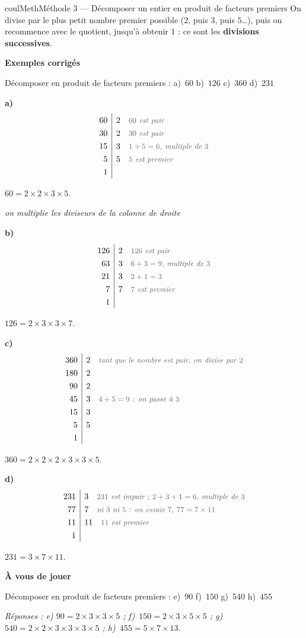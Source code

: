 \documentclass[11pt,a4paper]{article}
\makeatletter
\newcounter{lycee@signet}
\newcommand{\signet}[3][]{\stepcounter{lycee@signet}%
  \edef\lycee@dest{\if\relax\detokenize{#1}\relax
    signet.\arabic{lycee@signet}\else#1\fi}%
  \hypertarget{\lycee@dest}{}\bookmark[level=#2,dest=\lycee@dest]{#3}}
\newcommand{\res}[1]{#1}
\newcounter{methode}
\newenvironment{methodebox}[1][Méthode]{\stepcounter{methode}%
  \begin{boitecours}[phantom={\signet[methode-\arabic{methode}]{2}{#1}}]{coulMeth}{#1}}%
  {\end{boitecours}}
\newcommand{\etape}[1]{\par\smallskip\textbf{\color{coulMeth}#1}\par\nobreak\smallskip}
\newcommand{\reponse}[1]{\par\smallskip
  {\footnotesize\itshape\color{black!55}Réponses : #1}}
\newcommand{\rem}[1]{\text{\small\itshape\color{black!60}#1}}
\newcommand{\explique}[2]{\par\smallskip\noindent
  \begin{minipage}[t]{0.57\linewidth}\raggedright #1\end{minipage}\hfill
  \begin{minipage}[t]{0.40\linewidth}\raggedright\leavevmode
    {\small\itshape\color{black!60}#2}\end{minipage}\par}
\newcommand{\cas}[1]{\par\smallskip\noindent\textbf{\color{coulExo}#1}\vadjust{\nobreak}}
\newenvironment{correction}{\par}{\par}
\newcommand{\etapeexemples}{\etape{Exemples corrigés}}
\makeatother
\begin{document}
\begin{methodebox}[Méthode 3 --- Décomposer un entier en produit de facteurs premiers]
On divise par le plus petit nombre premier possible ($2$, puis $3$, puis $5$\ldots), puis
on recommence avec le quotient, jusqu'à obtenir $1$ : ce sont les \textbf{divisions
successives}.
\etapeexemples
Décomposer en produit de facteurs premiers :
\quad a)~$60$ \qquad b)~$126$ \qquad c)~$360$ \qquad d)~$231$
\begin{correction}
\cas{a)}
\[
\renewcommand{\arraystretch}{1.3}
\begin{array}{r|l}
60 & 2 \quad \rem{$60$ est pair}\\
30 & 2 \quad \rem{$30$ est pair}\\
15 & 3 \quad \rem{$1+5=6$, multiple de $3$}\\
5 & 5 \quad \rem{$5$ est premier}\\
1 &
\end{array}
\]
\explique{$60=\res{2\times 2\times 3\times 5}$.}{on multiplie les diviseurs de la colonne de droite}
\cas{b)}
\[
\renewcommand{\arraystretch}{1.3}
\begin{array}{r|l}
126 & 2 \quad \rem{$126$ est pair}\\
63 & 3 \quad \rem{$6+3=9$, multiple de $3$}\\
21 & 3 \quad \rem{$2+1=3$}\\
7 & 7 \quad \rem{$7$ est premier}\\
1 &
\end{array}
\]
\explique{$126=\res{2\times 3\times 3\times 7}$.}{}
\cas{c)}
\[
\renewcommand{\arraystretch}{1.3}
\begin{array}{r|l}
360 & 2 \quad \rem{tant que le nombre est pair, on divise par $2$}\\
180 & 2\\
90 & 2\\
45 & 3 \quad \rem{$4+5=9$ : on passe à $3$}\\
15 & 3\\
5 & 5\\
1 &
\end{array}
\]
\explique{$360=\res{2\times 2\times 2\times 3\times 3\times 5}$.}{}
\cas{d)}
\[
\renewcommand{\arraystretch}{1.3}
\begin{array}{r|l}
231 & 3 \quad \rem{$231$ est impair ; $2+3+1=6$, multiple de $3$}\\
77 & 7 \quad \rem{ni $3$ ni $5$ : on essaie $7$, $77=7\times 11$}\\
11 & 11 \quad \rem{$11$ est premier}\\
1 &
\end{array}
\]
\explique{$231=\res{3\times 7\times 11}$.}{}
\end{correction}

\etape{À vous de jouer}
Décomposer en produit de facteurs premiers :
\quad e)~$90$ \qquad f)~$150$ \qquad g)~$540$ \qquad h)~$455$
\reponse{e) $90=2\times 3\times 3\times 5$ ;\; f)~$150=2\times 3\times 5\times 5$ ;\;
g)~$540=2\times 2\times 3\times 3\times 3\times 5$ ;\; h)~$455=5\times 7\times 13$.}
\end{methodebox}
\end{document}
